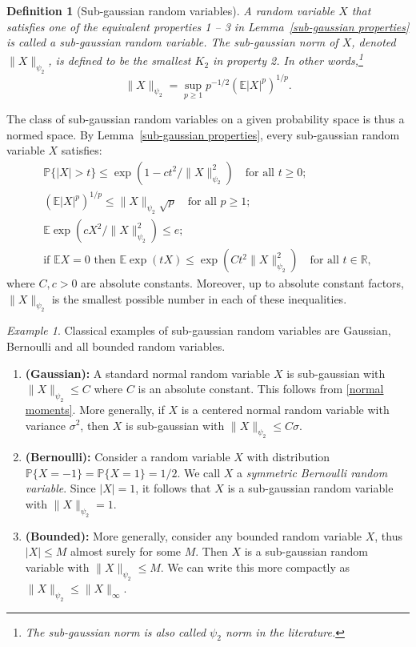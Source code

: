\documentclass[10pt, openany]{book}
\newtheorem{definition}[theorem]{Definition}
\theoremstyle{remark}
\newtheorem{example}[theorem]{Example}
\def \R {\mathbb{R}}
\def \E {\mathbb{E}}
\def \P {\mathbb{P}}
\def \s {\sigma}
\def \psitwo {{\psi_2}}
\begin{document}
\begin{definition}[Sub-gaussian random variables]  
  A random variable $X$ that satisfies one of the equivalent properties 1 -- 3 in Lemma~\ref{sub-gaussian properties}
  is called a {\em sub-gaussian random variable}.
  The {\em sub-gaussian norm}  of $X$, denoted $\|X\|_\psitwo$, 
  is defined to be the smallest $K_2$ in property 2.
  In other words,\footnote{The sub-gaussian norm is also called $\psitwo$ norm in the literature.}
  $$
  \|X\|_\psitwo = \sup_{p \ge 1} p^{-1/2} (\E |X|^p)^{1/p}.
  $$  
\end{definition}

The class of sub-gaussian random variables on a given probability space 
is thus a normed space. By Lemma~\ref{sub-gaussian properties},
every sub-gaussian random variable $X$ satisfies:
\begin{gather}
\P \{ |X| > t \} \le \exp(1-ct^2/\|X\|_\psitwo^2) \quad \text{for all } t \ge 0; 	\label{sub-gaussian tail}\\
(\E |X|^p)^{1/p} \le \|X\|_\psitwo \sqrt{p} \quad \text{for all } p \ge 1; 		\label{sub-gaussian moments}\\
\E \exp(cX^2/\|X\|_\psitwo^2) \le e; \nonumber\\
\text{if $\E X =0$ then } \E \exp(tX) \le \exp(C t^2 \|X\|_\psitwo^2) \quad \text{for all } t \in \R, \label{sub-gaussian mgf}
\end{gather}
where $C, c > 0$ are absolute constants. Moreover, up to absolute constant factors, 
$\|X\|_\psitwo$ is the smallest possible number in each of these inequalities.

\begin{example}
Classical examples of sub-gaussian random variables are Gaussian, Bernoulli
and all bounded random variables.  
\begin{enumerate}
  \item {\bf (Gaussian):} A standard normal random variable $X$ is sub-gaussian with 
  $\|X\|_\psitwo \le C$ where $C$ is an absolute constant. This follows from \eqref{normal moments}. 
  More generally, if $X$ is 
  a centered normal random variable with variance $\s^2$, then $X$ is sub-gaussian 
  with $\|X\|_\psitwo \le C \s$.
  
  \item {\bf (Bernoulli):}  Consider a random variable $X$ with distribution 
  $\P\{X=-1\} = \P\{X=1\} = 1/2$. We call $X$ a {\em symmetric Bernoulli random variable}.
  Since $|X|=1$, it follows that $X$ is a sub-gaussian random variable with $\|X\|_\psitwo = 1$. 
      
  \item {\bf (Bounded):} More generally, consider any bounded random variable $X$, 
  thus $|X| \le M$ almost surely for some $M$. Then $X$ is a sub-gaussian random variable with $\|X\|_\psitwo \le M$.
  We can write this more compactly as
  $\|X\|_\psitwo \le \|X\|_\infty$.
\end{enumerate}
\end{example}
\end{document}

